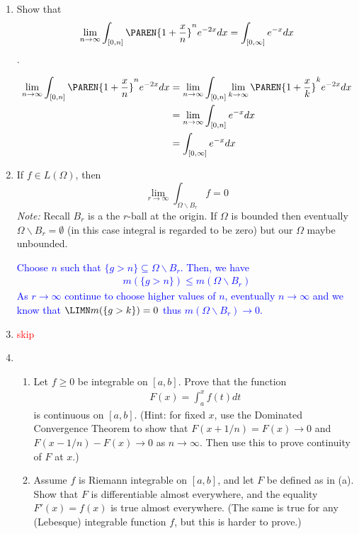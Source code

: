 \documentclass[10pt,a4paper]{report}
\newcommand{\RED}[1]{\textcolor{red}{#1}}
\newcommand{\BLUE}[1]{\textcolor{blue}{#1}}
\begin{document}
\begin{enumerate}[label=\Roman*.]
\item Show that $$ \lim_{n\to\infty} \int_{[0,n]}\PAREN{1+\frac{x}{n}}^n e^{-2x} dx = \int_{[0,\infty]} e^{-x}dx$$.

\BLUE{\begin{align*}
	\lim_{n\to\infty} \int_{[0,n]}\PAREN{1+\frac{x}{n}}^n e^{-2x} dx &= \lim_{n\to\infty} \int_{[0,n]}\lim_{k\to \infty} \PAREN{1+\frac{x}{k}}^k e^{-2x} dx \\
	&= \lim_{n\to\infty} \int_{[0,n]} e^{-x} dx \\
	&= \int_{[0,\infty]} e^{-x} dx
\end{align*}
}

\item If $f \in L(\Omega)$, then $$ \lim_{r \to \infty} \int_{\Omega \backslash B_r} f = 0$$\textit{Note: } Recall $B_r$ is a the $r$-ball at the origin.  If $\Omega$ is bounded then eventually $\Omega \backslash B_r = \emptyset$ (in this case integral is regarded to be zero) but our $\Omega$ maybe unbounded.

\BLUE{Choose $n$ such that $\{g>n\} \subseteq \Omega \backslash B_r$.  Then, we have 
\begin{align*}
	m(\{g>n\}) \le m(\Omega \backslash B_r) 
\end{align*}As $r \to \infty$ continue to choose higher values of $n$, eventually $n \to \infty$ and we know that $\LIMN m(\{g>k\}) = 0$ thus $m(\Omega \backslash B_r) \to 0$.
}

\item \RED{skip}

\item \begin{enumerate}[label=(\alph*)]
	\item Let $f \ge 0$ be integrable on $[a,b]$.  Prove that the function 
	\begin{align*}
		F(x) = \int_a^x f(t) dt
	\end{align*}is continuous on $[a,b]$.  (Hint: for fixed $x$, use the Dominated Convergence Theorem to show that $F(x+1/n)=F(x) \to 0$ and $F(x-1/n)-F(x) \to 0$ as $n\to \infty$.  Then use this to prove continuity of $F$ at $x$.)
	
\item Assume $f$ is Riemann integrable on $[a,b]$, and let $F$ be defined as in (a). Show that $F$ is differentiable almost everywhere, and the equality $F'(x)=f(x)$ is true almost everywhere.
	(The same is true for any (Lebesque) integrable function $f$, but this is harder to prove.)
\end{enumerate}
	

\end{enumerate}
\end{document}
